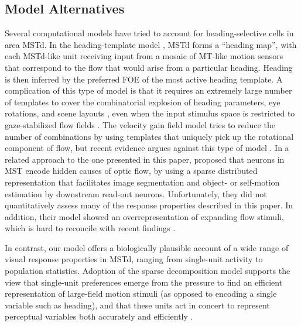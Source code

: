 \subsection{Model Alternatives}
\label{sec:MSTd|discussion|alternatives}
Several computational models have tried to account for heading-selective cells in 
area \ac{MSTd}. In the heading-template model \citep{PerroneStone1994,PerroneStone1998},
\ac{MSTd} forms a ``heading map'', with each \ac{MSTd}-like unit receiving input from a
mosaic of \ac{MT}-like motion sensors that correspond to the flow that would arise from
a particular heading. 
Heading is then inferred by the preferred \ac{FOE} of the most active heading template. 
A complication of this type of model is that it requires an extremely large number of
templates to cover the combinatorial explosion of heading parameters, eye rotations, 
and scene layouts \citep{PerroneStone1994}, even when the input stimulus space is
restricted to gaze-stabilized flow fields \citep{PerroneStone1998}.
The velocity gain field model \citep{BeintemaVanDenBerg1998,BeintemaVanDenBerg2000}
tries to reduce the number of combinations by using templates that uniquely pick up the
rotational component of flow, but recent evidence argues against this type of model
\citep{BerezovskiiBorn2000,Duijnhouwer2013}.
In a related approach to the one presented in this paper, \cite{ZemelSejnowski1998}
proposed that neurons in \ac{MST} encode hidden causes of optic flow, by using a 
sparse distributed representation that facilitates image segmentation and object- or 
self-motion estimation by downstream read-out neurons. 
Unfortunately, they did not quantitatively assess many of the response properties 
described in this paper. In addition, their model showed an overrepresentation of 
expanding flow stimuli, which is hard to reconcile with recent findings 
\citep{Gu2006}.

In contrast, our model offers a biologically plausible account of a wide range of visual
response properties in \ac{MSTd}, ranging from single-unit activity to population 
statistics. Adoption of the sparse decomposition model supports the view that 
single-unit preferences emerge from the pressure to find an efficient representation 
of large-field motion stimuli (as opposed to encoding a single variable such as heading),
and that these units act in concert to represent perceptual variables both accurately 
\citep{Gu2010} and efficiently \citep{BenHamed2003}.
